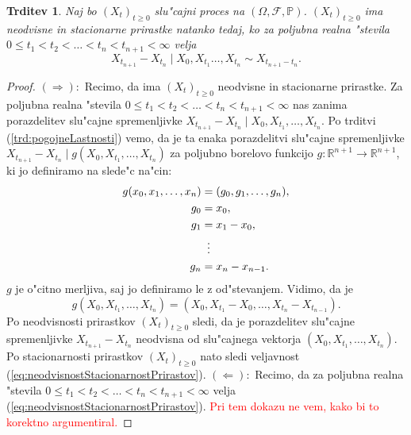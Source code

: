\documentclass[12pt, a4paper, reqno]{amsart}
\theoremstyle{definition}
\theoremstyle{plain}
\newtheorem{trditev}[definicija]{Trditev}
\newcommand{\R}{\mathbb{R}}
\newcommand{\F}{\mathcal{F}}
\newcommand{\1}{\mathds{1}}
\begin{document}
        \begin{trditev}
            Naj bo $(X_t)_{t\geq0}$ slu"cajni proces na $(\Omega, \F, \mathbb{P})$. $(X_t)_{t\geq0}$ ima
            neodvisne in stacionarne prirastke natanko tedaj, ko za poljubna realna "stevila
            $0\leq t_1 < t_2 < \ldots < t_n < t_{n+1} < \infty$ velja 
            \begin{equation}
                X_{t_{n+1}} - X_{t_n}\mid X_{0}, X_{t_1} \dots, X_{t_n} \sim X_{t_{n+1} - t_n}.
                \label{eq:neodvisnostStacionarnostPrirastov}
            \end{equation}
            \label{trd:neodvisnostStacionarnostPrirastov}
        \end{trditev}

        \begin{proof}
            $(\Rightarrow):$ Recimo, da ima $(X_t)_{t\geq0}$ neodvisne in stacionarne prirastke. Za 
            poljubna realna "stevila $0\leq t_1 < t_2 < \ldots < t_n < t_{n+1} < \infty$ nas zanima porazdelitev 
            slu"cajne spremenljivke $X_{t_{n+1}} - X_{t_n}\mid X_{0}, X_{t_1}, \dots, X_{t_n}$.
            Po trditvi (\ref{trd:pogojneLastnosti}) vemo, da je ta enaka porazdelitvi slu"cajne spremenljivke
            $X_{t_{n+1}} - X_{t_n}\mid g(X_0, X_{t_1}, \dots, X_{t_n})$ za poljubno borelovo funkcijo $g:\R^{n+1}\to \R^{n+1}$,
            ki jo definiramo na slede"c na"cin:
            \pagebreak
            \begin{align*}
                g(x_0, x_1, \dots, x_n) &= (g_0, g_1, \dots, g_n),\\
                                    g_0 &= x_0, \\
                                    g_1 &= x_1 - x_0, \\
                                    &\mathrel{\makebox[\widthof{=}]{\vdots}} \\
                                    g_n &= x_n - x_{n-1}.
            \end{align*}
            $g$ je o"citno merljiva, saj jo definiramo le z od"stevanjem.
            Vidimo, da je 
            $$g(X_0, X_{t_1}, \dots, X_{t_n}) = (X_0, X_{t_1} - X_0, \dots, X_{t_n} - X_{t_{n-1}}).$$ 
            Po neodvisnosti prirastkov $(X_t)_{t\geq0}$ sledi, da je porazdelitev slu"cajne 
            spremenljivke $X_{t_{n+1}} - X_{t_n}$ neodvisna od slu"cajnega vektorja
            $(X_0, X_{t_1}, \dots, X_{t_n})$. Po stacionarnosti prirastkov $(X_t)_{t\geq0}$ nato sledi 
            veljavnost (\ref{eq:neodvisnostStacionarnostPrirastov}). \newline
            \noindent
            $(\Leftarrow):$ Recimo, da za poljubna realna "stevila $0\leq t_1 < t_2 < \ldots < t_n < t_{n+1} < \infty$ velja
            (\ref{eq:neodvisnostStacionarnostPrirastov}).
            \textcolor{red}{Pri tem dokazu ne vem, kako bi to korektno argumentiral.}
        \end{proof}
\end{document}
